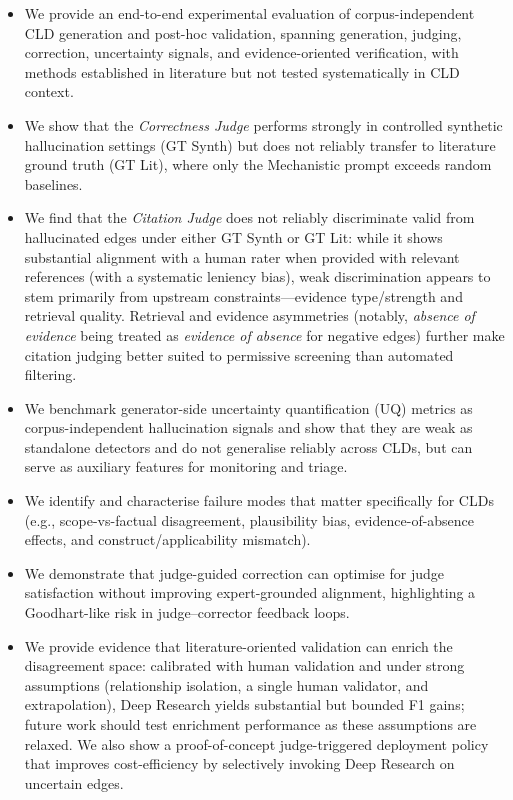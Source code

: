 \begin{itemize}[noitemsep]
    \item We provide an end-to-end experimental evaluation of corpus-independent CLD generation and post-hoc validation, spanning generation, judging, correction, uncertainty signals, and evidence-oriented verification, with methods established in literature but not tested systematically in CLD context.
    \item We show that the \textit{Correctness Judge} performs strongly in controlled synthetic hallucination settings (GT Synth) but does not reliably transfer to literature ground truth (GT Lit), where only the Mechanistic prompt exceeds random baselines.
    \item We find that the \textit{Citation Judge} does not reliably discriminate valid from hallucinated edges under either GT Synth or GT Lit: while it shows substantial alignment with a human rater when provided with relevant references (with a systematic leniency bias), weak discrimination appears to stem primarily from upstream constraints---evidence type/strength and retrieval quality. Retrieval and evidence asymmetries (notably, \textit{absence of evidence} being treated as \textit{evidence of absence} for negative edges) further make citation judging better suited to permissive screening than automated filtering.
    \item We benchmark generator-side uncertainty quantification (UQ) metrics as corpus-independent hallucination signals and show that they are weak as standalone detectors and do not generalise reliably across CLDs, but can serve as auxiliary features for monitoring and triage.
    \item We identify and characterise failure modes that matter specifically for CLDs (e.g., scope-vs-factual disagreement, plausibility bias, evidence-of-absence effects, and construct/applicability mismatch).
    \item We demonstrate that judge-guided correction can optimise for judge satisfaction without improving expert-grounded alignment, highlighting a Goodhart-like risk in judge--corrector feedback loops.
    \item We provide evidence that literature-oriented validation can enrich the disagreement space: calibrated with human validation and under strong assumptions (relationship isolation, a single human validator, and extrapolation), Deep Research yields substantial but bounded F1 gains; future work should test enrichment performance as these assumptions are relaxed. We also show a proof-of-concept judge-triggered deployment policy that improves cost-efficiency by selectively invoking Deep Research on uncertain edges.
\end{itemize}

